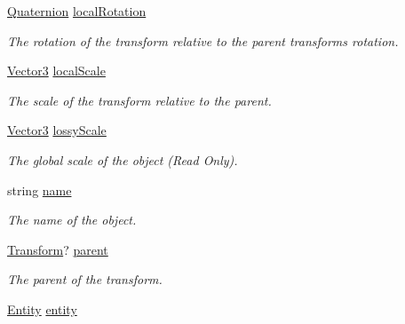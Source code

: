 \begin{DoxyCompactItemize}
\mbox{\hyperlink{class_lua_1_1_quaternion}{Quaternion}} \mbox{\hyperlink{class_lua_1_1_transform_a2397fd50baf04311df6a50e4dcc302bd}{local\+Rotation}}
\begin{DoxyCompactList}\small\item\em The rotation of the transform relative to the parent transform\textquotesingle{}s rotation. \end{DoxyCompactList}\item 
\mbox{\hyperlink{class_lua_1_1_vector3}{Vector3}} \mbox{\hyperlink{class_lua_1_1_transform_a40e2891bff5d714d77449aeee6d84492}{local\+Scale}}
\begin{DoxyCompactList}\small\item\em The scale of the transform relative to the parent. \end{DoxyCompactList}\item 
\mbox{\hyperlink{class_lua_1_1_vector3}{Vector3}} \mbox{\hyperlink{class_lua_1_1_transform_a55680638b6e6ae6b1bd4b5095b1822f1}{lossy\+Scale}}
\begin{DoxyCompactList}\small\item\em The global scale of the object (Read Only). \end{DoxyCompactList}\item 
string \mbox{\hyperlink{class_lua_1_1_transform_af1ca076a9406c3865fef9cbf8393e484}{name}}
\begin{DoxyCompactList}\small\item\em The name of the object. \end{DoxyCompactList}\item 
\mbox{\hyperlink{class_lua_1_1_transform}{Transform}}? \mbox{\hyperlink{class_lua_1_1_transform_a8b6f784d7b29fbff37daec2e2001d991}{parent}}
\begin{DoxyCompactList}\small\item\em The parent of the transform. \end{DoxyCompactList}\item 
\mbox{\hyperlink{class_lua_1_1_entity}{Entity}} \mbox{\hyperlink{class_lua_1_1_transform_a1a4480b448b89a7e1f392af4c842cc28}{entity}}

\end{DoxyCompactItemize}

